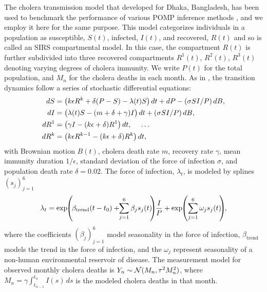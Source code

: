 \documentclass[numsec,webpdf,modern,medium,namedate]{oup-authoring-template}
\theoremstyle{thmstyleone}%
\theoremstyle{thmstyletwo}%
\theoremstyle{thmstylethree}%
\begin{document}
The cholera transmission model that \cite{king08} developed for Dhaka, Bangladesh, has been used to benchmark the performance of various POMP inference methods \citep{ionides15, fasiolo16, wycoff24}, and we employ it here for the same purpose.
This model categorizes individuals in a population as susceptible, $S(t)$, infected, $I(t)$, and recovered, $R(t)$ and so is called an SIRS compartmental model.
In this case, the compartment $R(t)$ is further subdivided into 
three recovered compartments $R^1(t)$, $R^2(t)$, $R^3(t)$ denoting varying degrees of cholera immunity.
We write $P(t)$ for the total population, and $M_n$ for the cholera deaths in each month.
As in \cite{king08}, the transition dynamics follow a series of stochastic differential equations:
\vspace*{-1mm}
\begin{align*}
    dS&=\big(k \epsilon R^k+\delta(P-S)-\lambda(t) S\big)\, dt+d P-({\sigma S I}/{P})\, dB, \\
    dI&=\big(\lambda(t) S-(m+\delta+\gamma) I\big)\, dt+({\sigma S I}/{P})\, dB, \\
    dR^1&=\big(\gamma I-(k \epsilon+\delta) R^1\big)\, dt, \hspace{3ex} \dots \\
    dR^k&=\big(k \epsilon R^{k-1} -(k \epsilon+\delta) R^k\big)\, dt,
    \vspace*{-3ex}
\end{align*}
with Brownian motion $B(t)$, cholera death rate $m$, recovery rate $\gamma$, mean immunity duration $1/\epsilon$, standard deviation of the force of infection $\sigma$, and population death rate $\delta=0.02$. The force of infection, $\lambda_t$, is modeled by splines $(s_j)_{j=1}^6$
\vspace*{-3ex}
\begin{equation*}    \lambda_t=\exp\hspace{-1mm}\left(\hspace{-.5mm}\beta_{\text{trend}}(t-t_0)+\hspace{-1mm}\sum_{j=1}^{6} \beta_j s_j(t)\hspace{-1mm}\right)\hspace{-1mm}\frac{I}{P} + \exp\hspace{-1mm} \left(\sum_{j=1}^{6} \omega_j s_j(t)\hspace{-1mm}\right)\hspace{-1mm},
    \vspace*{-3ex}
\end{equation*}
where the coefficients $(\beta_j)_{j=1}^6$ model seasonality in the force of infection, $\beta_{\text{trend}}$ models the trend in the force of infection, and the $\omega_j$ represent seasonality of a non-human environmental reservoir of disease.
The measurement model for observed monthly cholera deaths is
    $Y_n \sim {\mathcal{N}}(M_n, \tau^2M_n^2)$,
where $M_n=\gamma\int_{t_{n-1}}^{t_n}I(s)\, ds$ is the modeled cholera deaths in that month.
\end{document}
